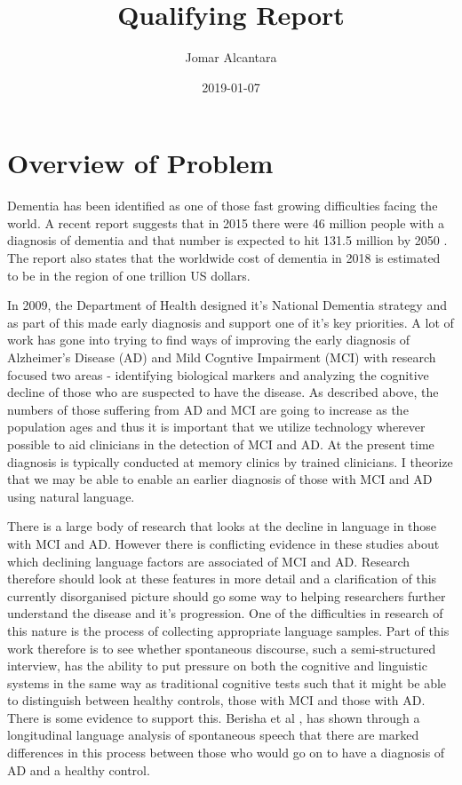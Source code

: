 \documentclass{article}
\title{Qualifying Report}
\date{2019-01-07}
\author{Jomar Alcantara}
\begin{document}
\maketitle
\newpage
\begin{abstract}

\end{abstract}
\tableofcontents
\newpage
\listoftables
\newpage
\listoffigures
\newpage
\section{Overview of Problem}
Dementia has been identified as one of those fast growing difficulties facing the world. A recent report suggests that in 2015 there were 46 million people with a diagnosis of dementia and that number is expected to hit 131.5 million by 2050 \cite{Prince2015}. The report also states that the worldwide cost of dementia in 2018 is estimated to be in the region of one trillion US dollars.
\par
In 2009, the Department of Health designed it's National Dementia strategy and as part of this made early diagnosis and support one of it's key priorities. A lot of work has gone into trying to find ways of improving the early diagnosis of Alzheimer's Disease (AD) and Mild Cogntive Impairment (MCI) with research focused two areas - identifying biological markers and analyzing the cognitive decline of those who are suspected to have the disease. As described above, the numbers of those suffering from AD and MCI are going to increase as the population ages and thus it is important that we utilize technology wherever possible to aid clinicians in the detection of MCI and AD. At the present time diagnosis is typically conducted at memory clinics by trained clinicians. I theorize that we may be able to enable an earlier diagnosis of those with MCI and AD using natural language.
\par
There is a large body of research that looks at the decline in language in those with MCI and AD. However there is conflicting evidence in these studies about which declining language factors are associated of MCI and AD. Research therefore should look at these features in more detail and a clarification of this currently disorganised picture should go some way to helping researchers further understand the disease and it's progression. One of the difficulties in research of this nature is the process of collecting appropriate language samples. Part of this work therefore is to see whether spontaneous discourse, such a semi-structured interview, has the ability to put pressure on both the cognitive and linguistic systems in the same way as traditional cognitive tests such that it might be able to distinguish between healthy controls, those with MCI and those with AD. There is some evidence to support this. Berisha et al \cite{Berisha2015}, has shown through a longitudinal language analysis of spontaneous speech that there are marked differences in this process between those who would go on to have a diagnosis of AD and a healthy control. 
\end{document}
